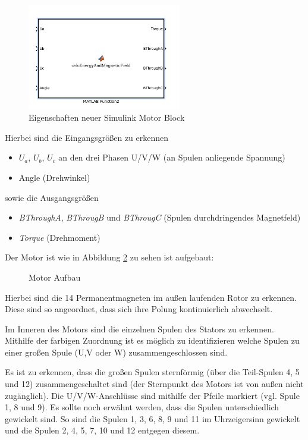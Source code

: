 \begin{figure}[htbp]
	\centering
	\includegraphics[width=0.6\textwidth]{./sim/pictures/matlabBox.png}
	\caption{Eigenschaften neuer Simulink Motor Block}
	\label{FigMotorBlock}
\end{figure}
Hierbei sind die Eingangsgrößen zu erkennen
\begin{itemize}
	\item $U_a$, $U_b$, $U_c$ an den drei Phasen U/V/W (an Spulen anliegende Spannung)
	\item Angle (Drehwinkel)
\end{itemize}
sowie die Ausgangsgrößen
\begin{itemize}
	\item \textit{BThroughA}, \textit{BThrougB} und \textit{BThrougC} (Spulen durchdringendes Magnetfeld)
	\item \textit{Torque} (Drehmoment)
\end{itemize}

\vspace{1cm}
Der Motor ist wie in Abbildung \ref{FigMotorAufbau} zu sehen ist aufgebaut:

\begin{figure}[htbp] 
	\centering
	
	\caption{Motor Aufbau}
	\label{FigMotorAufbau}
\end{figure}


Hierbei sind die 14 Permanentmagneten im außen laufenden Rotor zu erkennen. Diese sind so angeordnet, dass sich ihre Polung kontinuierlich abwechselt. 

Im Inneren des Motors sind die einzelnen Spulen des Stators zu erkennen. Mithilfe der farbigen Zuordnung ist es möglich zu identifizieren welche Spulen zu einer großen Spule (U,V oder W) zusammengeschlossen sind. 

Es ist zu erkennen, dass die großen Spulen sternförmig (über die Teil-Spulen 4, 5 und 12) zusammengeschaltet sind (der Sternpunkt des Motors ist von außen nicht zugänglich).
Die U/V/W-Anschlüsse sind mithilfe der Pfeile markiert (vgl. Spule 1, 8 und 9). 
Es sollte noch erwähnt werden, dass die Spulen unterschiedlich gewickelt sind. So sind die Spulen 1, 3, 6, 8, 9 und 11 im Uhrzeigersinn gewickelt und die Spulen 2, 4, 5, 7, 10 und 12 entgegen diesem.

